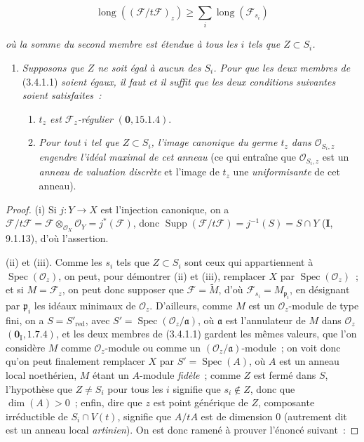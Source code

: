 \begin{env}[3.4.1.1]
\label{IV.2.3.4.1.1-fr}
\[
\operatorname{long}((\mathcal F/t\mathcal F)_z)
\geqslant\sum_i\operatorname{long}(\mathcal F_{s_i})
\]
\end{env}

\textit{où la somme du second membre est étendue à tous les $i$ tels que
$Z\subset S_i$.}

\begin{enumerate}
\item[(iii)] \textit{Supposons que $Z$ ne soit égal à aucun des $S_i$. Pour que les
deux membres de} (3.4.1.1) \textit{soient égaux, il faut et il suffit que les deux
conditions suivantes soient satisfaites~:}
\begin{enumerate}
\item[$\alpha$)] \textit{$t_z$ est $\mathcal F_z$-régulier} $(\mathbf{0},15.1.4)$.
\item[$\beta$)] \textit{Pour tout $i$ tel que $Z\subset S_i$, l'image canonique du
germe $t_z$ dans $\mathcal O_{S_i,z}$ engendre l'idéal maximal de cet anneau}
(ce qui entraîne que $\mathcal O_{S_i,z}$ est un \emph{anneau de valuation discrète}
et l'image de $t_z$ une \emph{uniformisante} de cet anneau).
\end{enumerate}
\end{enumerate}

\begin{proof}
(i) Si $j:Y\to X$ est l'injection canonique, on a
$\mathcal F/t\mathcal F=\mathcal F\otimes_{\mathcal O_X}\mathcal O_Y=j^*(\mathcal F)$, donc
$\operatorname{Supp}(\mathcal F/t\mathcal F)=j^{-1}(S)=S\cap Y$ (\textbf{I}, 9.1.13), d'où l'assertion.

(ii) et (iii). Comme les $s_i$ tels que $Z\subset S_i$ sont ceux qui
appartiennent à $\operatorname{Spec}(\mathcal O_z)$, on peut, pour démontrer
(ii) et (iii), remplacer $X$ par $\operatorname{Spec}(\mathcal O_z)$~; et si
$M=\mathcal F_z$, on peut donc supposer que $\mathcal F=\widetilde M$, d'où
$\mathcal F_{s_i}=M_{\mathfrak p_i}$, en désignant par $\mathfrak p_i$ les
idéaux minimaux de $\mathcal O_z$. D'ailleurs, comme $M$ est un
$\mathcal O_z$-module de type fini, on a $S=S'_{\mathrm{red}}$, avec
$S'=\operatorname{Spec}(\mathcal O_z/\mathfrak a)$, où $\mathfrak a$ est
l'annulateur de $M$ dans $\mathcal O_z$ $(\mathbf{0}_{\mathrm I},1.7.4)$, et les deux
membres de (3.4.1.1) gardent les mêmes valeurs, que l'on considère $M$ comme
$\mathcal O_z$-module ou comme un $(\mathcal O_z/\mathfrak a)$-module~; on voit
donc qu'on peut finalement remplacer $X$ par $S'=\operatorname{Spec}(A)$, où
$A$ est un anneau local noethérien, $M$ étant un $A$-module \emph{fidèle}~; comme $Z$
est fermé dans $S$, l'hypothèse que $Z\neq S_i$ pour tous les $i$ signifie que
$s_i\notin Z$, donc que $\dim(A)>0$~; enfin, dire que $z$ est point générique
de $Z$, composante irréductible de $S_i\cap V(t)$, signifie que $A/tA$ est de
dimension $0$ (autrement dit est un anneau local \emph{artinien}). On est donc ramené
à prouver l'énoncé suivant~:
\end{proof}

